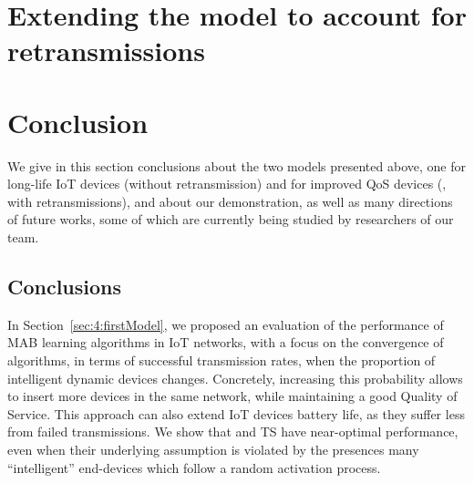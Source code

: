 



\section{Extending the model to account for retransmissions}
\label{sec:4:retransmissions}





\section{Conclusion}
\label{sec:4:conclusion}

We give in this section conclusions about the two models presented above, one for long-life IoT devices (without retransmission) and for improved QoS devices (\ie, with retransmissions), and about our demonstration, as well as many directions of future works, some of which are currently being studied by researchers of our team.


\subsection*{Conclusions}

\label{sub:41:conclusion}

In Section~\ref{sec:4:firstModel}, we proposed an evaluation of the performance of MAB learning algorithms in IoT networks,
with a focus on the convergence of algorithms, in terms of successful transmission rates, when the proportion of intelligent dynamic devices changes.
Concretely, increasing this probability allows to insert more devices in the same network, while maintaining a good Quality of Service.
This approach can also extend IoT devices battery life, as they suffer less from failed transmissions.
We show that \UCB{} and TS have near-optimal performance, even when their underlying \iid{} assumption is violated by the presences many ``intelligent'' end-devices which follow a random activation process.

